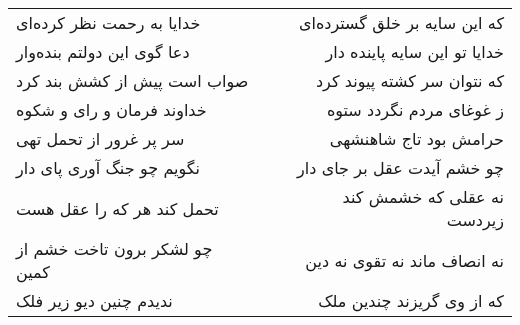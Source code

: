 \begin{center}
\begin{longtable}{l p{0.5cm} r}
\\
خدایا به رحمت نظر کرده‌ای
&&
که این سایه بر خلق گسترده‌ای
\\
دعا گوی این دولتم بنده‌وار
&&
خدایا تو این سایه پاینده دار
\\
صواب است پیش از کشش بند کرد
&&
که نتوان سر کشته پیوند کرد
\\
خداوند فرمان و رای و شکوه
&&
ز غوغای مردم نگردد ستوه
\\
سر پر غرور از تحمل تهی
&&
حرامش بود تاج شاهنشهی
\\
نگویم چو جنگ آوری پای دار
&&
چو خشم آیدت عقل بر جای دار
\\
تحمل کند هر که را عقل هست
&&
نه عقلی که خشمش کند زیردست
\\
چو لشکر برون تاخت خشم از کمین
&&
نه انصاف ماند نه تقوی نه دین
\\
ندیدم چنین دیو زیر فلک
&&
که از وی گریزند چندین ملک
\\
\end{longtable}
\end{center}
